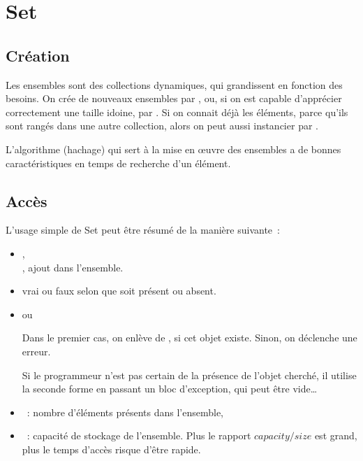 \newpage

\section{Set}

\subsection{Cr\'eation}
Les ensembles sont des collections dynamiques, qui grandissent en fonction des
besoins. On cr\'ee de nouveaux ensembles par , ou, si on est
capable d'appr\'ecier correctement une taille idoine, par .
Si on connait d\'ej\`a les \'el\'ements, parce qu'ils sont rang\'es dans une
autre collection, alors on peut aussi instancier par .

L'algorithme (hachage) qui sert \`a la mise en {\oe}uvre des ensembles a de bonnes
caract\'eristiques en temps de recherche d'un \'el\'ement.

\subsection{Acc\`es}

L'usage simple de Set peut \^etre r\'esum\'e de la mani\`ere suivante~:

\begin{itemize}
\item {},\\  ,
ajout dans l'ensemble.
\item {} vrai ou faux selon que 
soit pr\'esent ou absent.
\item {} ou \\

Dans le premier cas, on enl\`eve  de , si cet objet
existe. Sinon, on d\'eclenche une erreur.

Si le programmeur n'est pas certain de la pr\'esence de l'objet cherch\'e,
il utilise la seconde forme en passant un bloc d'exception, qui peut
\^etre vide\ldots 

\item  {} ~: nombre d'\'el\'ements pr\'esents dans l'ensemble,
\item  {} ~: capacit\'e de stockage de l'ensemble.
Plus le rapport $ capacity / size $ est grand, plus le temps d'acc\`es risque d'\^etre
rapide.
\end{itemize}


